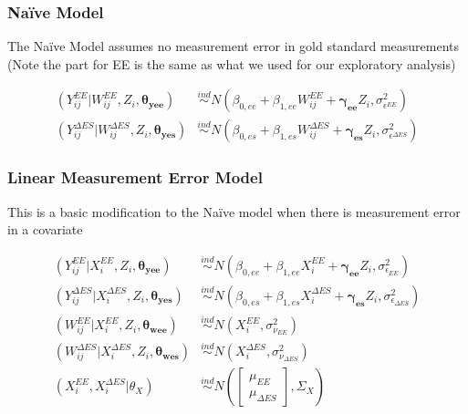 \documentclass[handout]{beamer}\usepackage[]{graphicx}\usepackage[]{color}
\begin{document}
\begin{frame}
\frametitle{Na{\"i}ve Model}

The Na{\"i}ve Model assumes no measurement error in gold standard measurements (Note the part for EE is the same as what we used for our exploratory analysis) \\

\vspace{1cm}

\begin{align*}
  (Y_{ij}^{EE} | W_{ij}^{EE},Z_i,\boldsymbol{\theta_{yee}}) &\overset{ind}{\sim} N(\beta_{0,ee} + \beta_{1,ee}W_{ij}^{EE}+ \boldsymbol{\gamma_{ee}}Z_i,\sigma_{\epsilon^{EE}}^2) \\
  (Y_{ij}^{\Delta ES} | W_{ij}^{\Delta ES},Z_i,\boldsymbol{\theta_{yes}}) &\overset{ind}{\sim} N(\beta_{0,es} + \beta_{1,es}W_{ij}^{\Delta ES}+ \boldsymbol{\gamma_{es}}Z_i,\sigma_{\epsilon^{\Delta ES}}^2)
\end{align*}

\end{frame}


\begin{frame}
\frametitle{Linear Measurement Error Model}
This is a basic modification to the Na{\"i}ve model when there is measurement error in a covariate

\begin{align*}
  (Y_{ij}^{EE}|X_i^{EE}, Z_i,\boldsymbol{\theta_{yee}}) &\overset{ind}{\sim} N(\beta_{0,ee} + \beta_{1,ee}X_i^{EE} + \boldsymbol{\gamma_{ee}}Z_i, \sigma_{\epsilon_{EE}}^2) \\
  (Y_{ij}^{\Delta ES}|X_i^{\Delta ES}, Z_i,\boldsymbol{\theta_{yes}}) &\overset{ind}{\sim} N(\beta_{0,es} + \beta_{1,es}X_i^{\Delta ES} +  \boldsymbol{\gamma_{es}}Z_i, \sigma_{\epsilon_{\Delta ES}}^2) \\
  (W_{ij}^{EE}|X_i^{EE}, Z_i,\boldsymbol{\theta_{wee}}) &\overset{ind}{\sim} N(X_i^{EE}, \sigma_{\nu_{EE}}^2 ) \\
  (W_{ij}^{\Delta ES}|X_i^{\Delta ES}, Z_i,\boldsymbol{\theta_{wes}}) &\overset{ind}{\sim} N(X_i^{\Delta ES}, \sigma_{\nu_{\Delta ES}}^2 )  \\
  (X_i^{EE},X_i^{\Delta ES}|\theta_X) &\overset{ind}{\sim} N\left(
  \begin{bmatrix}
  \mu_{EE}\\
  \mu_{\Delta ES}
  \end{bmatrix}
  , \Sigma_X
  \right)
\end{align*}

\end{frame}
\end{document}
